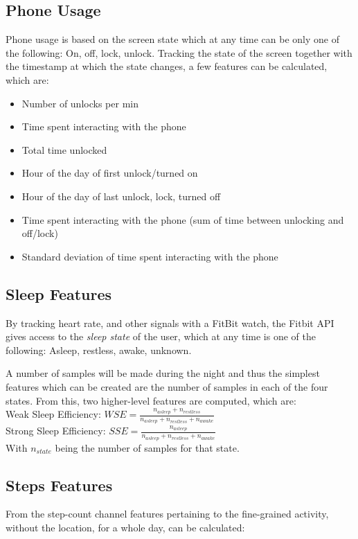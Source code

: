 \subsection{Phone Usage}
Phone usage is based on the screen state which at any time can be only one of the following: On, off, lock, unlock. Tracking the state of the screen together with the timestamp at which the state changes, a few features can be calculated, which are:

\begin{itemize}
    \item Number of unlocks per min
    \item Time spent interacting with the phone
    \item Total time unlocked
    \item Hour of the day of first unlock/turned on
    \item Hour of the day of last unlock, lock, turned off
    \item Time spent interacting with the phone (sum of time between unlocking and off/lock)
    \item Standard deviation of time spent interacting with the phone
\end{itemize}


\subsection{Sleep Features}
By tracking heart rate, and other signals with a FitBit watch, the Fitbit API gives access to the \textit{sleep state} of the user, which at any time is one of the following: Asleep, restless, awake, unknown.

A number of samples will be made during the night and thus the simplest features which can be created are the number of samples in each of the four states. 
From this, two higher-level features are computed, which are: \\

Weak Sleep Efficiency: $WSE = \frac{n_{asleep} + n_{restless}}{n_{asleep} + n_{restless} + n_{awake}}$\\

Strong Sleep Efficiency: $SSE = \frac{n_{asleep}}{n_{asleep} + n_{restless} + n_{awake}}$\\

With $n_{state}$ being the number of samples for that state.


\subsection{Steps Features}
From the step-count channel features pertaining to the fine-grained activity, without the location, for a whole day, can be calculated:

